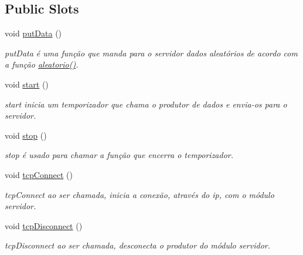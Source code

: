 \subsection*{Public Slots}
\begin{DoxyCompactItemize}
\item 
void \mbox{\hyperlink{class_main_window_afdfeb13ec363b0eb8ecacaf0aa13b605}{put\+Data}} ()
\begin{DoxyCompactList}\small\item\em put\+Data é uma função que manda para o servidor dados aleatórios de acordo com a função {\itshape \mbox{\hyperlink{class_main_window_ab29e2b2ee8118c9d36c45820309a9093}{aleatorio()}}}. \end{DoxyCompactList}\item 
void \mbox{\hyperlink{class_main_window_a5edcbc314e782645cdf4db101eeb247d}{start}} ()
\begin{DoxyCompactList}\small\item\em start inicia um temporizador que chama o produtor de dados e envia-\/os para o servidor. \end{DoxyCompactList}\item 
void \mbox{\hyperlink{class_main_window_a939e90ddfe07d74be87b351ca2171fb0}{stop}} ()
\begin{DoxyCompactList}\small\item\em stop é usado para chamar a função que encerra o temporizador. \end{DoxyCompactList}\item 
void \mbox{\hyperlink{class_main_window_ac5b669957c442b6eb68573dacfce33e1}{tcp\+Connect}} ()
\begin{DoxyCompactList}\small\item\em tcp\+Connect ao ser chamada, inicia a conexão, através do ip, com o módulo servidor. \end{DoxyCompactList}\item 
void \mbox{\hyperlink{class_main_window_a4d22c4c7afc7ba0a2fa4c70515c85dda}{tcp\+Disconnect}} ()
\begin{DoxyCompactList}\small\item\em tcp\+Disconnect ao ser chamada, desconecta o produtor do módulo servidor. \end{DoxyCompactList}\end{DoxyCompactItemize}
